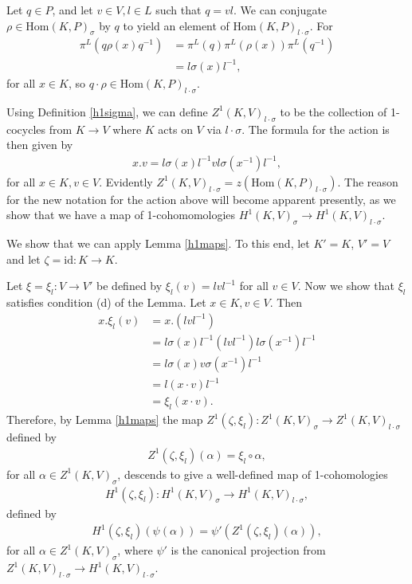 Let $q \in P$, and let $v \in V, l \in L$ such that $q = vl$. We can conjugate $\rho \in \mathrm{Hom}(K, P)_\sigma$ by $q$ to yield an element of $\mathrm{Hom}(K, P)_{l \cdot \sigma}$. For
\begin{align*}%
\pi^L\left(q \rho(x) q^{-1}\right)%
&= \pi^L\left(q\right) \pi^L\left(\rho(x)\right) \pi^L\left(q^{-1}\right) \\
&= l \sigma(x) l^{-1},
\end{align*}
for all $x \in K$, so $q \cdot \rho \in \mathrm{Hom}(K, P)_{l\cdot \sigma}$.

Using Definition \ref{h1sigma}, we can define $Z^1(K, V)_{l \cdot \sigma}$ to be the collection of 1-cocycles from $K \rightarrow V$ where $K$ acts on $V$ via $l \cdot \sigma$. The formula for the action is then given by
\begin{align*}
	x.v = l \sigma(x) l^{-1} v l \sigma(x^{-1}) l^{-1},
\end{align*}
for all $x \in K, v \in V$. Evidently $Z^1(K, V)_{l \cdot \sigma} = z\left(\mathrm{Hom}(K, P)_{l \cdot \sigma}\right)$. The reason for the new notation for the action above will become apparent presently, as we show that we have a map of 1-cohomomologies $H^1(K, V)_\sigma \rightarrow H^1(K, V)_{l \cdot \sigma}$.

	We show that we can apply Lemma \ref{h1maps}. To this end, let $K' = K$, $V' = V$ and let $\zeta = \mathrm{id}:K \rightarrow K$.

Let $\xi = \xi_l: V \rightarrow V'$ be defined by	$\xi_l(v) = lvl^{-1}$ for all $v \in V$. Now we show that $\xi_l$ satisfies condition (d) of the Lemma. Let $x \in K, v \in V$. Then
	\begin{align*}
		x . \xi_l(v) &= x . \left(lvl^{-1}\right) \\
		&= l\sigma(x)l^{-1} \left(lvl^{-1}\right) l\sigma(x^{-1})l^{-1} \\
		&= l\sigma(x)v\sigma(x^{-1})l^{-1} \\
		&= l\left(x \cdot v \right)l^{-1} \\
		&= \xi_l \left(x \cdot v \right).
	\end{align*}
	Therefore, by Lemma \ref{h1maps} the map $Z^1(\zeta, \xi_l):Z^1(K, V)_\sigma \rightarrow Z^1(K, V)_{l \cdot \sigma}$ defined by 
	\begin{align*}
		Z^1(\zeta, \xi_l)(\alpha) = \xi_l \circ \alpha,
	\end{align*}
	for all $\alpha \in Z^1(K, V)_\sigma$,
	descends to give a well-defined map of 1-cohomologies
	\begin{align*}
		H^1(\zeta, \xi_l):H^1(K, V)_\sigma \rightarrow H^1(K, V)_{l \cdot \sigma},
	\end{align*}
	defined by
	\begin{align*}
		H^1(\zeta, \xi_l)\left(\psi(\alpha)\right) = \psi'\left(Z^1(\zeta, \xi_l)(\alpha)\right),
	\end{align*}
	for all $\alpha \in Z^1(K, V)_\sigma$,
	where $\psi'$ is the canonical projection from $Z^1(K, V)_{l \cdot \sigma} \rightarrow H^1(K, V)_{l \cdot \sigma}$.

